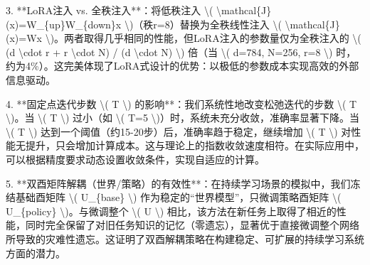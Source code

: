 \documentclass[
  12pt,
]{article}
\newenvironment{Shaded}{}{}
\newcommand{\DecValTok}[1]{\textcolor[rgb]{0.25,0.63,0.44}{#1}}
\newcommand{\FloatTok}[1]{\textcolor[rgb]{0.25,0.63,0.44}{#1}}
\newcommand{\NormalTok}[1]{#1}
\newcommand{\OperatorTok}[1]{\textcolor[rgb]{0.40,0.40,0.40}{#1}}
\begin{document}
\begin{Shaded}
\begin{Highlighting}[]
\FloatTok{3.}  \OperatorTok{**}\NormalTok{LoRA注入 vs. 全秩注入}\OperatorTok{**}\NormalTok{：将低秩注入 }\OperatorTok{\textbackslash{}}\NormalTok{( }\OperatorTok{\textbackslash{}}\NormalTok{mathcal\{J\}(x)}\OperatorTok{=}\NormalTok{W\_\{up\}W\_\{down\}x }\OperatorTok{\textbackslash{}}\NormalTok{)（秩r}\OperatorTok{=}\DecValTok{8}\NormalTok{）替换为全秩线性注入 }\OperatorTok{\textbackslash{}}\NormalTok{( }\OperatorTok{\textbackslash{}}\NormalTok{mathcal\{J\}(x)}\OperatorTok{=}\NormalTok{Wx }\OperatorTok{\textbackslash{}}\NormalTok{)。两者取得几乎相同的性能，但LoRA注入的参数量仅为全秩注入的 }\OperatorTok{\textbackslash{}}\NormalTok{( (d }\OperatorTok{\textbackslash{}}\NormalTok{cdot r }\OperatorTok{+}\NormalTok{ r }\OperatorTok{\textbackslash{}}\NormalTok{cdot N) }\OperatorTok{/}\NormalTok{ (d }\OperatorTok{\textbackslash{}}\NormalTok{cdot N) }\OperatorTok{\textbackslash{}}\NormalTok{) 倍（当 }\OperatorTok{\textbackslash{}}\NormalTok{( d}\OperatorTok{=}\DecValTok{784}\NormalTok{, N}\OperatorTok{=}\DecValTok{256}\NormalTok{, r}\OperatorTok{=}\DecValTok{8} \OperatorTok{\textbackslash{}}\NormalTok{) 时，约为}\DecValTok{4}\OperatorTok{\%}\NormalTok{）。这完美体现了LoRA式设计的优势：以极低的参数成本实现高效的外部信息驱动。}

\FloatTok{4.}  \OperatorTok{**}\NormalTok{固定点迭代步数 }\OperatorTok{\textbackslash{}}\NormalTok{( T }\OperatorTok{\textbackslash{}}\NormalTok{) 的影响}\OperatorTok{**}\NormalTok{：我们系统性地改变松弛迭代的步数 }\OperatorTok{\textbackslash{}}\NormalTok{( T }\OperatorTok{\textbackslash{}}\NormalTok{)。当 }\OperatorTok{\textbackslash{}}\NormalTok{( T }\OperatorTok{\textbackslash{}}\NormalTok{) 过小（如 }\OperatorTok{\textbackslash{}}\NormalTok{( T}\OperatorTok{=}\DecValTok{5} \OperatorTok{\textbackslash{}}\NormalTok{)）时，系统未充分收敛，准确率显著下降。当 }\OperatorTok{\textbackslash{}}\NormalTok{( T }\OperatorTok{\textbackslash{}}\NormalTok{) 达到一个阈值（约}\DecValTok{15}\OperatorTok{{-}}\DecValTok{20}\NormalTok{步）后，准确率趋于稳定，继续增加 }\OperatorTok{\textbackslash{}}\NormalTok{( T }\OperatorTok{\textbackslash{}}\NormalTok{) 对性能无提升，只会增加计算成本。这与理论上的指数收敛速度相符。在实际应用中，可以根据精度要求动态设置收敛条件，实现自适应的计算。}

\FloatTok{5.}  \OperatorTok{**}\NormalTok{双酉矩阵解耦（世界}\OperatorTok{/}\NormalTok{策略）的有效性}\OperatorTok{**}\NormalTok{：在持续学习场景的模拟中，我们冻结基础酉矩阵 }\OperatorTok{\textbackslash{}}\NormalTok{( U\_\{base\} }\OperatorTok{\textbackslash{}}\NormalTok{) 作为稳定的“世界模型”，只微调策略酉矩阵 }\OperatorTok{\textbackslash{}}\NormalTok{( U\_\{policy\} }\OperatorTok{\textbackslash{}}\NormalTok{)。与微调整个 }\OperatorTok{\textbackslash{}}\NormalTok{( U }\OperatorTok{\textbackslash{}}\NormalTok{) 相比，该方法在新任务上取得了相近的性能，同时完全保留了对旧任务知识的记忆（零遗忘），显著优于直接微调整个网络所导致的灾难性遗忘。这证明了双酉解耦策略在构建稳定、可扩展的持续学习系统方面的潜力。}


\end{Highlighting}
\end{Shaded}
\end{document}
